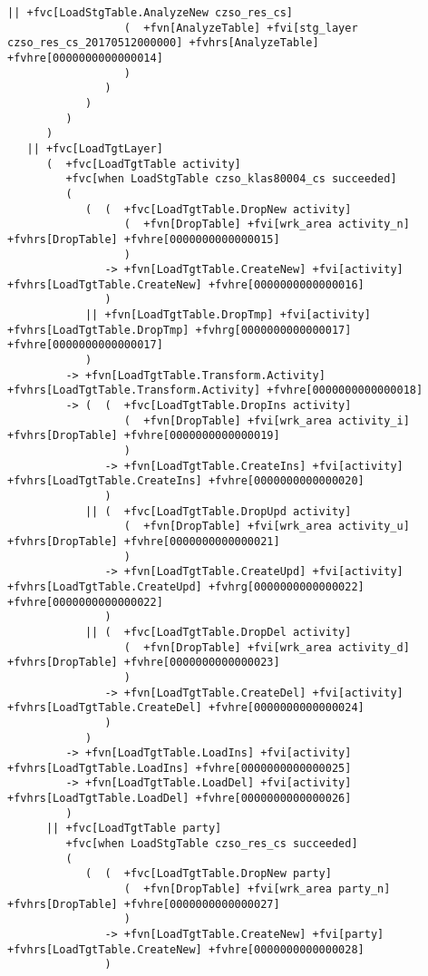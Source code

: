 \documentclass[a4paper,12pt,english,oneside]{book}
\begin{document}
\begin{landscape}
\begin{Verbatim}[commandchars=+\[\]]
               || +fvc[LoadStgTable.AnalyzeNew czso_res_cs]
                  (  +fvn[AnalyzeTable] +fvi[stg_layer czso_res_cs_20170512000000] +fvhrs[AnalyzeTable] +fvhre[0000000000000014]
                  )
               )  
            )  
         )  
      )  
   || +fvc[LoadTgtLayer]
      (  +fvc[LoadTgtTable activity]
         +fvc[when LoadStgTable czso_klas80004_cs succeeded]
         (  
            (  (  +fvc[LoadTgtTable.DropNew activity]
                  (  +fvn[DropTable] +fvi[wrk_area activity_n] +fvhrs[DropTable] +fvhre[0000000000000015]
                  )
               -> +fvn[LoadTgtTable.CreateNew] +fvi[activity] +fvhrs[LoadTgtTable.CreateNew] +fvhre[0000000000000016]
               )  
            || +fvn[LoadTgtTable.DropTmp] +fvi[activity] +fvhrs[LoadTgtTable.DropTmp] +fvhrg[0000000000000017] +fvhre[0000000000000017]
            )  
         -> +fvn[LoadTgtTable.Transform.Activity] +fvhrs[LoadTgtTable.Transform.Activity] +fvhre[0000000000000018]
         -> (  (  +fvc[LoadTgtTable.DropIns activity]
                  (  +fvn[DropTable] +fvi[wrk_area activity_i] +fvhrs[DropTable] +fvhre[0000000000000019]
                  )
               -> +fvn[LoadTgtTable.CreateIns] +fvi[activity] +fvhrs[LoadTgtTable.CreateIns] +fvhre[0000000000000020]
               )  
            || (  +fvc[LoadTgtTable.DropUpd activity]
                  (  +fvn[DropTable] +fvi[wrk_area activity_u] +fvhrs[DropTable] +fvhre[0000000000000021]
                  )
               -> +fvn[LoadTgtTable.CreateUpd] +fvi[activity] +fvhrs[LoadTgtTable.CreateUpd] +fvhrg[0000000000000022] +fvhre[0000000000000022]
               )  
            || (  +fvc[LoadTgtTable.DropDel activity]
                  (  +fvn[DropTable] +fvi[wrk_area activity_d] +fvhrs[DropTable] +fvhre[0000000000000023]
                  )
               -> +fvn[LoadTgtTable.CreateDel] +fvi[activity] +fvhrs[LoadTgtTable.CreateDel] +fvhre[0000000000000024]
               ) 
            )  
         -> +fvn[LoadTgtTable.LoadIns] +fvi[activity] +fvhrs[LoadTgtTable.LoadIns] +fvhre[0000000000000025]
         -> +fvn[LoadTgtTable.LoadDel] +fvi[activity] +fvhrs[LoadTgtTable.LoadDel] +fvhre[0000000000000026]
         )  
      || +fvc[LoadTgtTable party]
         +fvc[when LoadStgTable czso_res_cs succeeded]
         (  
            (  (  +fvc[LoadTgtTable.DropNew party]
                  (  +fvn[DropTable] +fvi[wrk_area party_n] +fvhrs[DropTable] +fvhre[0000000000000027]
                  )
               -> +fvn[LoadTgtTable.CreateNew] +fvi[party] +fvhrs[LoadTgtTable.CreateNew] +fvhre[0000000000000028]
               )  

\end{Verbatim}
\end{landscape}
\end{document}
